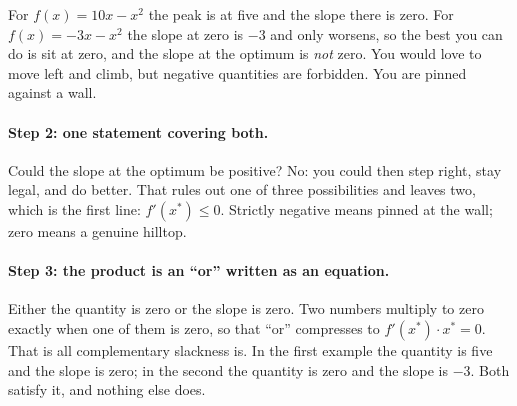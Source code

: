 \documentclass[11pt]{article}
\theoremstyle{definition}
\begin{document}
\begin{center}
\end{center}

\vspace{6pt}
For $f(x)=10x-x^2$ the peak is at five and the slope there is zero. For $f(x)=-3x-x^2$ the
slope at zero is $-3$ and only worsens, so the best you can do is sit at zero, and the slope
at the optimum is \emph{not} zero. You would love to move left and climb, but negative
quantities are forbidden. You are pinned against a wall.

\paragraph{Step 2: one statement covering both.} Could the slope at the optimum be positive?
No: you could then step right, stay legal, and do better. That rules out one of three
possibilities and leaves two, which is the first line: $f'(x^*)\le0$. Strictly negative
means pinned at the wall; zero means a genuine hilltop.

\paragraph{Step 3: the product is an ``or'' written as an equation.} Either the quantity is
zero or the slope is zero. Two numbers multiply to zero exactly when one of them is zero, so
that ``or'' compresses to $f'(x^*)\cdot x^*=0$. That is all complementary slackness is. In
the first example the quantity is five and the slope is zero; in the second the quantity is
zero and the slope is $-3$. Both satisfy it, and nothing else does.
\end{document}
